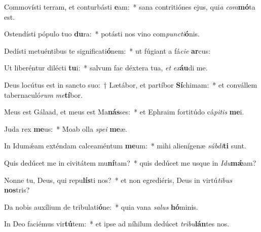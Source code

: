 \item Commovísti terram, et conturbásti \textbf{e}am:~* sana contritiónes ejus, qui\textit{a} \textit{com}\textbf{mó}ta est.
\item Ostendísti pópulo tuo \textbf{du}ra:~* potásti nos vino com\textit{punc}\textit{ti}\textbf{ó}nis.
\item Dedísti metuéntibus te significati\textbf{ó}nem:~* ut fúgiant a fá\textit{ci}\textit{e} \textbf{ar}cus:
\item Ut liberéntur dilécti \textbf{tu}i:~* salvum fac déxtera tua, \textit{et} \textit{ex}\textbf{áu}di me.
\item Deus locútus est in sancto suo:~† Lætábor, et partíbor \textbf{Sí}chimam:~* et convállem tabernaculó\textit{rum} \textit{me}\textbf{tí}bor.
\item Meus est Gálaad, et meus est Ma\textbf{nás}ses:~* et Ephraim fortitúdo cá\textit{pi}\textit{tis} \textbf{me}i.
\item Juda rex \textbf{me}us:~* Moab olla \textit{spe}\textit{i} \textbf{me}æ.
\item In Idumǽam exténdam calceaméntum \textbf{me}um:~* mihi alienígenæ \textit{súb}\textit{di}\textbf{ti} sunt.
\item Quis dedúcet me in civitátem mu\textbf{ní}tam?~* quis dedúcet me usque in \textit{I}\textit{du}\textbf{mǽ}am?
\item Nonne tu, Deus, qui repu\textbf{lís}ti nos?~* et non egrediéris, Deus in virtú\textit{ti}\textit{bus} \textbf{nos}tris?
\item Da nobis auxílium de tribulati\textbf{ó}ne:~* quia vana \textit{sa}\textit{lus} \textbf{hó}minis.
\item In Deo faciémus vir\textbf{tú}tem:~* et ipse ad níhilum dedúcet \textit{tri}\textit{bu}\textbf{lán}tes nos.
